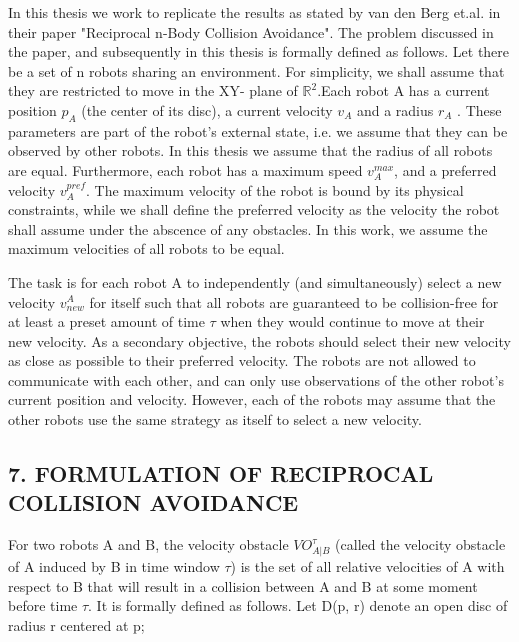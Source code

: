 \documentclass[12pt]{report}
\begin{document}
In this thesis we work to replicate the results as stated by van den Berg et.al. in their paper "Reciprocal n-Body Collision Avoidance". The problem discussed in the paper, and subsequently in this thesis is formally defined as follows. Let there be a set of n robots sharing an environment. For simplicity, we shall assume that they are restricted to move in the XY- plane of $\mathbb{R}^{2}$.Each robot A has a current position $p_{A}$ (the center of its disc), a current velocity $v_{A}$ and a radius $r_{A}$ . These parameters are part of the robot’s external state, i.e. we assume that they can be observed by other robots. In this thesis we assume that the radius of all robots are equal. Furthermore, each robot has a maximum speed $v_{A}^{max}$, and a preferred velocity $v_{A}^{pref}$. The maximum velocity of the robot is bound by its physical constraints, while we shall define the preferred velocity as the velocity the robot shall assume under the abscence of any obstacles. In this work, we assume the maximum velocities of all robots to be equal.\newline

The task is for each robot A to independently (and simultaneously) select a new
velocity $v_{new}^{A}$ for itself such that all robots are guaranteed to be collision-free for at least a preset amount of time $\tau$ when they would continue to move at their new velocity. As a secondary objective, the robots should select their new velocity as close as possible to their preferred velocity. The robots are not allowed to communicate with each other, and can only use observations of the other robot’s current position and velocity. However, each of the robots may assume that the other robots use the same strategy as itself to select a new velocity.

\begin{center}
\chapter*{7.  FORMULATION OF RECIPROCAL COLLISION AVOIDANCE}
\end{center}

For two robots A and B, the velocity obstacle $VO^{\tau}_{A|B}$ (called the velocity obstacle of A induced by B in time window $\tau$) is the set of all relative velocities of A with respect to B that will result in a collision between A and B at some moment before time $\tau$. It is formally defined as follows. Let D(p, r) denote an open disc of radius r centered at p;
\end{document}
